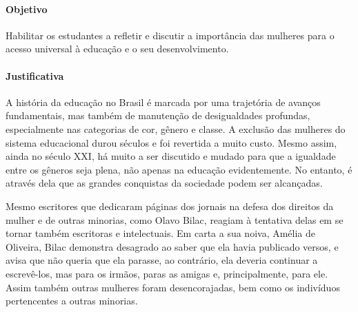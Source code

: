 \documentclass[12pt]{extarticle}
\begin{document}
\paragraph{Objetivo} Habilitar os estudantes a refletir e discutir a
importância das mulheres para o acesso universal à educação e o seu
desenvolvimento.

\paragraph{Justificativa} A história da educação no Brasil é marcada por
uma trajetória de avanços fundamentais, mas também de manutenção de
desigualdades profundas, especialmente nas categorias de cor, gênero e
classe. A exclusão das mulheres do sistema educacional durou séculos e
foi revertida a muito custo. Mesmo assim, ainda no século XXI, há muito
a ser discutido e mudado para que a igualdade entre os gêneros seja
plena, não apenas na educação evidentemente. No entanto, é através dela
que as grandes conquistas da sociedade podem ser alcançadas.

Mesmo escritores que dedicaram páginas dos jornais na defesa dos
direitos da mulher e de outras minorias, como Olavo Bilac, reagiam à
tentativa delas em se tornar também escritoras e intelectuais. Em carta
a sua noiva, Amélia de Oliveira, Bilac demonstra desagrado ao saber que
ela havia publicado versos, e avisa que não queria que ela parasse, ao
contrário, ela deveria continuar a escrevê-los, mas para os irmãos,
paras as amigas e, principalmente, para ele. Assim também outras
mulheres foram desencorajadas, bem como os indivíduos pertencentes a
outras minorias.
\end{document}
